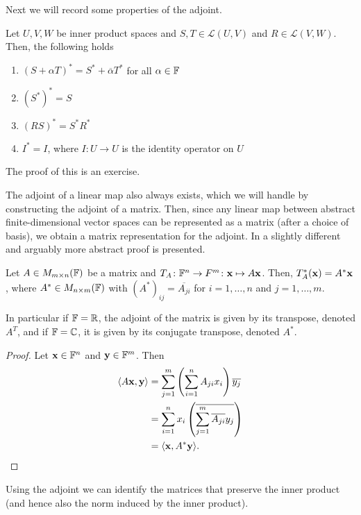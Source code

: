 \documentclass{article}
\begin{document}
Next we will record some properties of the adjoint.

\begin{proposition}
Let $U,V,W$ be inner product spaces and $S,T \in \mathcal{L}(U,V)$ and $R\in \mathcal{L}(V,W)$. Then, the following holds
\begin{enumerate}
    \item $(S+\alpha T)^* = S^* + \overline{\alpha}T^*$ for all $\alpha\in {\mathbb{F}}$
    \item $(S^*)^* = S$
    \item $(RS)^* = S^*R^*$
    \item $I^* = I$, where $I \colon U \to U$ is the identity operator on $U$
\end{enumerate}
\end{proposition}

The proof of this is an exercise. 

The adjoint of a linear map also always exists, which we will handle by constructing the adjoint of a matrix. Then, since any linear map between abstract finite-dimensional vector spaces can be represented as a matrix (after a choice of basis), we obtain a matrix representation for the adjoint.  In \cite{linalgright} a slightly different and arguably  more abstract proof is presented. 

\begin{proposition}
Let $A\in M_{m\times n}({\mathbb{F}})$ be a matrix and $T_A\colon {\mathbb{F}}^n\to F^m \colon {\mathbf{x}} \mapsto A{\mathbf{x}}$. Then, $T_A^*({\mathbf{x}}) = A^* {\mathbf{x}} $, where $A^*\in M_{n\times m}({\mathbb{F}})$ with $(A^*)_{ij} = \overline{A_{ji}}$ for $i=1,\ldots,n$ and $j=1,\ldots,m$. 

In particular if ${\mathbb{F}} = {\mathbb{R}}$, the adjoint of the matrix is given by its transpose, denoted $A^T$, and if ${\mathbb{F}} = {\mathbb{C}}$, it is given by its conjugate transpose, denoted $A^*$.
\end{proposition}

\begin{proof}
Let ${\mathbf{x}}\in {\mathbb{F}}^n$ and ${\mathbf{y}} \in {\mathbb{F}}^m$. Then
\begin{align*}
    \langle A{\mathbf{x}}, {\mathbf{y}} \rangle &= \sum_{j=1}^m \left(\sum_{i=1}^n A_{ji} x_i\right) \overline{y_j} \\
    &=\sum_{i=1}^n x_i \left( \overline{\sum_{j=1}^m \overline{A_{ji}} y_j}\right)\\
    &=\langle {\mathbf{x}}, A^* {\mathbf{y}} \rangle.
\end{align*}
\end{proof}

Using the adjoint we can identify the matrices that preserve the inner product (and hence also the norm induced by the inner product).
\end{document}

